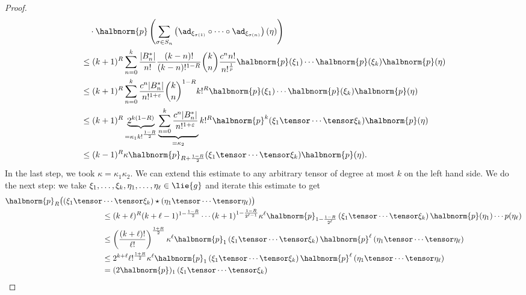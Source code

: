 \documentclass[
11pt,                          %
english                        %
]{article}
\begin{document}
\begin{proof}
\begin{align*}
		& \quad \cdot
		\halbnorm{p} \left(
			\sum	\limits_{\sigma \in S_n}
			\left( 
				\ad_{\xi_{\sigma(1)}} 
				\circ \cdots \circ
				\ad_{\xi_{\sigma(n)}}
			\right)
			(\eta)
		\right)
		\\
		& \leq
		(k + 1)^R
		\sum\limits_{n = 0}^k
		\frac{|B_n^*|}{n!}
		\frac{(k-n)!}{(k-n)!^{1 - R}}
		\binom{k}{n}
		\frac{c^n n!}{n!^{\frac{1}{p}}}
		\halbnorm{p}(\xi_1) \cdots \halbnorm{p}(\xi_k)
		\halbnorm{p}(\eta)
		\\
		& \leq
		(k + 1)^R
		\sum\limits_{n = 0}^k
		\frac{c^n |B_n^*|}{n!^{1 + \varepsilon}}
		\binom{k}{n}^{1-R}
		k!^R
		\halbnorm{p}(\xi_1) \cdots \halbnorm{p}(\xi_k) 
		\halbnorm{p}(\eta)
		\\
		& \leq
		(k + 1)^R
		\underbrace{
			2^{k (1-R)}
		}_{
			=\kappa_1 k!^{\frac{1-R}{2}}
		}
		\underbrace{
			\sum\limits_{n = 0}^k
			\frac{c^n |B_n^*|}{n!^{1 + \varepsilon}}
		}_{
			= \kappa_2
		}
		k!^R
		\halbnorm{p}^k(\xi_1 \tensor \cdots \tensor \xi_k) 
		\halbnorm{p}(\eta)
		\\
		& \leq
		(k-1)^R
		\kappa
		\halbnorm{p}_{R + \frac{1-R}{2}}
		(\xi_1 \tensor \cdots \tensor \xi_k)
		\halbnorm{p}(\eta).
	\end{align*}
	In the last step, we took $\kappa = \kappa_1 \kappa_2$. We can extend this 
	estimate to any arbitrary tensor of degree at most $k$ on the left hand side.
	We do the next step: we take $\xi_1, \ldots, \xi_k, \eta_1, \ldots, 
	\eta_\ell \in \lie{g}$ and iterate this estimate to get
	\begin{align*}
		\halbnorm{p}_R \big(
			(\xi_1 \tensor 
		&			
			\cdots \tensor \xi_k)
			\star
			(\eta_1 \tensor \cdots \tensor \eta_\ell)
		\big)
		\\
		& \leq
		(k + \ell)^R (k + \ell - 1)^{1 - \frac{1 - R}{2}}
		\cdots (k+1)^{{1 - \frac{1 - R}{2^{\ell - 1}}}}
		\kappa^\ell
		\halbnorm{p}_{1 - \frac{1-R}{2^\ell}}
		\left( \xi_1 \tensor \cdots \tensor \xi_k \right)
		\halbnorm{p}(\eta_1) \cdots p(\eta_\ell)
		\\
		& \leq
		\left( \frac{(k+\ell)!}{\ell!} \right)^{\frac{1 + R}{2}}
		\kappa^\ell
		\halbnorm{p}_1 \left( \xi_1 \tensor \cdots \tensor \xi_k \right)
		\halbnorm{p}^\ell \left( \eta_1 \tensor \cdots \tensor \eta_\ell \right)
		\\
		& \leq
		2^{k + \ell}
		\ell!^{\frac{1 + R}{2}}
		\kappa^\ell
		\halbnorm{p}_1 \left( \xi_1 \tensor \cdots \tensor \xi_k \right)
		\halbnorm{p}^\ell \left( \eta_1 \tensor \cdots \tensor \eta_\ell \right)
		\\
		&=
		(2 \halbnorm{p})_1 \left( \xi_1 \tensor \cdots \tensor \xi_k \right)

\end{align*}
\end{proof}
\end{document}

